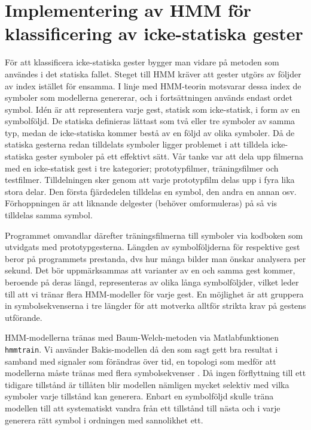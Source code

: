 \documentclass[../rapport_MVEX01-11-05]{subfiles}
\begin{document}
\section{Implementering av HMM för klassificering av icke-statiska gester}
För att klassificera icke-statiska gester bygger man vidare på metoden som användes i det 
statiska fallet. Steget till HMM kräver att gester utgörs av följder av index istället
för ensamma. I linje med HMM-teorin motsvarar dessa index de symboler som modellerna genererar, 
och i fortsättningen används endast ordet symbol. Idén är att representera varje gest, statisk som icke-statisk, i form av 
en symbolföljd. De statiska definieras lättast som två eller tre symboler av samma typ, medan 
de icke-statiska kommer bestå av en följd av olika symboler. Då de statiska gesterna redan tilldelats
symboler ligger problemet i att tilldela icke-statiska gester symboler på ett effektivt sätt. Vår tanke
var att dela upp filmerna med en icke-statisk gest i tre kategorier; prototypfilmer, träningsfilmer och 
testfilmer. Tilldelningen sker genom att varje prototypfilm delas upp i fyra lika stora delar. Den 
första fjärdedelen tilldelas en symbol, den andra en annan osv. Förhoppningen är att liknande 
delgester (behöver omformuleras) på så vis tilldelas samma symbol. 

Programmet omvandlar därefter träningsfilmerna till symboler via kodboken som utvidgats 
med prototypgesterna. Längden av 
symbolföljderna för respektive gest beror på programmets prestanda, dvs hur många bilder 
man önskar analysera per sekund. Det bör uppmärksammas att varianter av en och samma gest 
kommer, beroende på deras längd, representeras av olika långa symbolföljder, vilket leder till 
att vi tränar flera HMM-modeller för varje gest. En möjlighet är att gruppera in symbolsekvenserna 
i tre längder för att motverka alltför strikta krav på gestens utförande. 

HMM-modellerna tränas med Baum-Welch-metoden via Matlabfunktionen \texttt{hmmtrain}. Vi använder Bakis-modellen 
då den som sagt gett bra resultat i samband med signaler som förändras över tid, en topologi som medför att
modellerna måste tränas med flera symbolsekvenser \cite{Rabiner89}. Då ingen förflyttning till ett tidigare
tillstånd är tillåten blir modellen nämligen mycket selektiv med vilka symboler varje tillstånd kan generera. 
Enbart en symbolföljd skulle träna modellen till att systematiskt vandra från ett tillstånd till nästa och i 
varje generera rätt symbol i ordningen med sannolikhet ett. 
\end{document}
